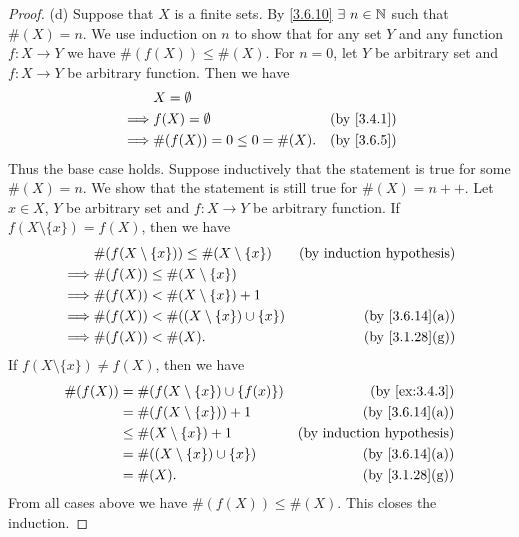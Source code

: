 \begin{proof}{(d)}
  Suppose that \(X\) is a finite sets.
  By \cref{3.6.10} \(\exists\ n \in \N\) such that \(\#(X) = n\).
  We use induction on \(n\) to show that for any set \(Y\) and any function \(f : X \to Y\) we have \(\#(f(X)) \leq \#(X)\).
  For \(n = 0\), let \(Y\) be arbitrary set and \(f : X \to Y\) be arbitrary function.
  Then we have
  \begin{align*}
             & X = \emptyset                                           \\
    \implies & f(X) = \emptyset             & \text{(by \cref{3.4.1})} \\
    \implies & \#(f(X)) = 0 \leq 0 = \#(X). & \text{(by \cref{3.6.5})}
  \end{align*}
  Thus the base case holds.
  Suppose inductively that the statement is true for some \(\#(X) = n\).
  We show that the statement is still true for \(\#(X) = n++\).
  Let \(x \in X\), \(Y\) be arbitrary set and \(f : X \to Y\) be arbitrary function.
  If \(f(X \setminus \{x\}) = f(X)\), then we have
  \begin{align*}
             & \#(f(X \setminus \{x\})) \leq \#(X \setminus \{x\}) & \text{(by induction hypothesis)} \\
    \implies & \#(f(X)) \leq \#(X \setminus \{x\})                                                    \\
    \implies & \#(f(X)) < \#(X \setminus \{x\}) + 1                                                   \\
    \implies & \#(f(X)) < \#((X \setminus \{x\}) \cup \{x\})       & \text{(by \cref{3.6.14}(a))}     \\
    \implies & \#(f(X)) < \#(X).                                   & \text{(by \cref{3.1.28}(g))}
  \end{align*}
  If \(f(X \setminus \{x\}) \neq f(X)\), then we have
  \begin{align*}
    \#(f(X)) & = \#(f(X \setminus \{x\}) \cup \{f(x)\}) & \text{(by \cref{ex:3.4.3})}      \\
             & = \#(f(X \setminus \{x\})) + 1           & \text{(by \cref{3.6.14}(a))}     \\
             & \leq \#(X \setminus \{x\}) + 1           & \text{(by induction hypothesis)} \\
             & = \#((X \setminus \{x\}) \cup \{x\})     & \text{(by \cref{3.6.14}(a))}     \\
             & = \#(X).                                 & \text{(by \cref{3.1.28}(g))}
  \end{align*}
  From all cases above we have \(\#(f(X)) \leq \#(X)\).
  This closes the induction.


\end{proof}
